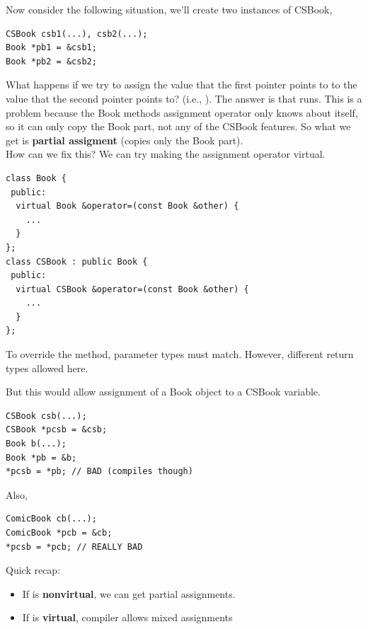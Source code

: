 \documentclass[english, 11pt]{article}
\begin{document}
Now consider the following situation, we'll create two instances of CSBook,
\begin{lstlisting}
CSBook csb1(...), csb2(...);
Book *pb1 = &csb1;
Book *pb2 = &csb2;
\end{lstlisting}
What happens if we try to assign the value that the first pointer points to to the value that the second pointer points to? (i.e., ). The answer is that  runs. This is a problem because the Book methods assignment operator only knows about itself, so it can only copy the Book part, not any of the CSBook features. So what we get is \textbf{partial assigment} (copies only the Book part). \\

How can we fix this? We can try making the assignment operator virtual.

\begin{lstlisting}
class Book {
 public:
  virtual Book &operator=(const Book &other) {
    ...
  }
};
class CSBook : public Book {
 public:
  virtual CSBook &operator=(const Book &other) {
    ...
  }
};
\end{lstlisting}
\begin{note}
  To override the method, parameter types must match. However, different return types allowed here.
\end{note}
But this would allow assignment of a Book object to a CSBook variable.
\begin{lstlisting}
CSBook csb(...);
CSBook *pcsb = &csb;
Book b(...);
Book *pb = &b;
*pcsb = *pb; // BAD (compiles though)
\end{lstlisting}

Also,
\begin{lstlisting}
ComicBook cb(...);
ComicBook *pcb = &cb;
*pcsb = *pcb; // REALLY BAD
\end{lstlisting}

Quick recap:
\begin{itemize}
  \item If  is \textbf{nonvirtual}, we can get partial assignments.
  \item If  is \textbf{virtual}, compiler allows mixed assignments
\end{itemize}
\end{document}
